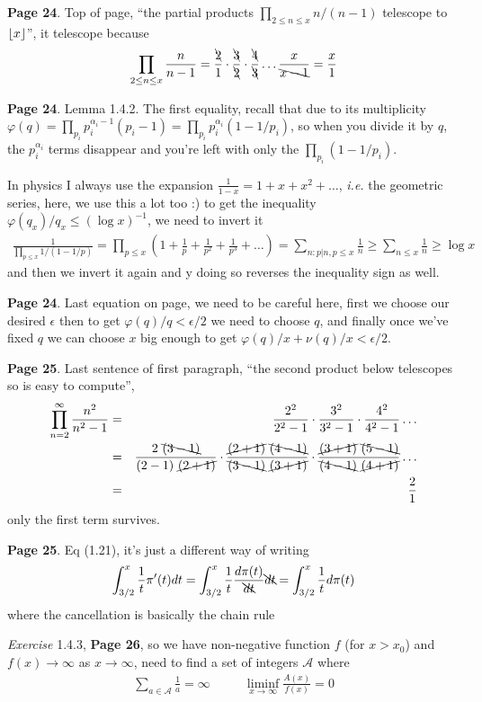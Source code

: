 \documentclass[aps,preprint,preprintnumbers,nofootinbib,showpacs,prd]{revtex4-1}
\newcommand{\ie}{{\it i.e.} }
\newcommand{\nbea}{\begin{eqnarray*}}
\newcommand{\neea}{\end{eqnarray*}}
\DeclarePairedDelimiter{\floor}{\lfloor}{\rfloor}
\begin{document}
{\bf Page 24}. Top of page, ``the partial products $\prod_{2\le n\le x} n/(n-1)$ telescope to $\floor{x}$'', it telescope because
%
\nbea
\prod_{2\le n\le x} \frac{n}{n-1} = \frac{\bcancel{2}}{1}\cdot\frac{\bcancel{3}}{\bcancel{2}}\cdot\frac{\bcancel{4}}{\bcancel{3}} \dots \frac{x}{\bcancel{x-1}} = \frac{x}{1}
\neea
%

{\bf Page 24}. Lemma 1.4.2. The first equality, recall that due to its multiplicity $\varphi(q) = \prod_{p_i} p_i^{\alpha_i - 1}( p_i -1) = \prod_{p_i} p_i^{\alpha_i }( 1 -1/p_i)$, so when you divide it by $q$, the $p_i^{\alpha_i }$ terms disappear and you're left with only the $\prod_{p_i} ( 1 -1/p_i)$.

In physics I always use the expansion $\frac{1}{1-x} = 1 + x + x^2 + \dots$, \ie the geometric series, here, we use this a lot too :) to get the inequality $\varphi(q_x)/q_x \le (\log x)^{-1}$, we need to invert it
%
\nbea
\frac{1}{\prod_{p\le x}1/(1-1/p)} = \prod_{p\le x}\left(1 + \frac{1}{p} + \frac{1}{p^2} + \frac{1}{p^3} + \dots \right) = \sum_{n: p|n, p \le x} \frac{1}{n} \ge \sum_{n \le x} \frac{1}{n} \ge \log x
\neea
%
and then we invert it again and y doing so reverses the inequality sign as well.

{\bf Page 24}. Last equation on page, we need to be careful here, first we choose our desired $\epsilon$ then to get $\varphi(q)/q < \epsilon/2$ we need to choose $q$, and finally once we've fixed $q$ we can choose $x$ big enough to get $\varphi(q)/x + \nu(q)/x < \epsilon/2$.

{\bf Page 25}. Last sentence of first paragraph, ``the second product below telescopes so is easy to compute'', 
%
\nbea
\prod_{n=2}^\infty \frac{n^2}{n^2 - 1} & = & \frac{2^2}{2^2-1} \cdot \frac{3^2}{3^2 - 1} \cdot \frac{4^2}{4^2 - 1} \dots \\
& = & \frac{2~\bcancel{(3-1)}}{(2-1)~\cancel{(2+1)}} \cdot \frac{\cancel{(2+1)}~\bcancel{(4-1)}}{\bcancel{(3 - 1)}~\cancel{(3 + 1)}} \cdot \frac{\cancel{(3+1)}~\bcancel{(5-1)}}{\bcancel{(4 - 1)}~\cancel{(4+1)}} \dots \\
& = & \frac{2}{1}
\neea
%
only the first term survives.

{\bf Page 25}. Eq (1.21), it's just a different way of writing
%
\nbea
\int_{3/2}^x \frac{1}{t} \pi'(t) dt = \int_{3/2}^x \frac{1}{t} \frac{d\pi(t)}{\bcancel{dt}} \bcancel{dt} = \int_{3/2}^x \frac{1}{t} d\pi(t)
\neea
%
where the cancellation is basically the chain rule

{\it Exercise} 1.4.3, {\bf Page 26}, so we have non-negative function $f$ (for $x > x_0$) and $f(x)\to\infty$ as $x\to\infty$, need to find a set of integers $\mathcal{A}$ where
%
\nbea
\sum_{a\in\mathcal{A}} \frac{1}{a} = \infty ~~~~~~~~~~~~ \liminf_{x\to\infty}\frac{A(x)}{f(x)} = 0
\neea
%
\end{document}
